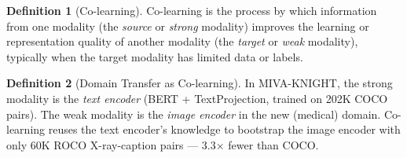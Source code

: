 \documentclass[12pt,a4paper]{article}
\theoremstyle{definition}
\newtheorem{definition}{Definition}[section]
\theoremstyle{plain}
\theoremstyle{remark}
\begin{document}
\begin{definition}[Co-learning]
Co-learning is the process by which information from one modality (the \emph{source} or \emph{strong} modality) improves the learning or representation quality of another modality (the \emph{target} or \emph{weak} modality), typically when the target modality has limited data or labels.
\end{definition}

\begin{definition}[Domain Transfer as Co-learning]
In MIVA-KNIGHT, the strong modality is the \emph{text encoder} (BERT + TextProjection, trained on 202K COCO pairs). The weak modality is the \emph{image encoder} in the new (medical) domain. Co-learning reuses the text encoder's knowledge to bootstrap the image encoder with only 60K ROCO X-ray-caption pairs — 3.3× fewer than COCO.
\end{definition}
\end{document}
